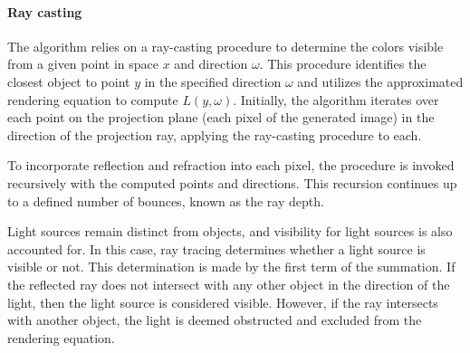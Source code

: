 \paragraph*{Ray casting}
The algorithm relies on a ray-casting procedure to determine the colors visible from a given point in space $x$ and direction $\omega$.
This procedure identifies the closest object to point $y$ in the specified direction $\omega$ and utilizes the approximated rendering equation to compute $L(y,\omega)$.
Initially, the algorithm iterates over each point on the projection plane (each pixel of the generated image) in the direction of the projection ray, applying the ray-casting procedure to each.

To incorporate reflection and refraction into each pixel, the procedure is invoked recursively with the computed points and directions. 
This recursion continues up to a defined number of bounces, known as the ray depth.

Light sources remain distinct from objects, and visibility for light sources is also accounted for. 
In this case, ray tracing determines whether a light source is visible or not.
This determination is made by the first term of the summation. 
If the reflected ray does not intersect with any other object in the direction of the light, then the light source is considered visible. 
However, if the ray intersects with another object, the light is deemed obstructed and excluded from the rendering equation.

